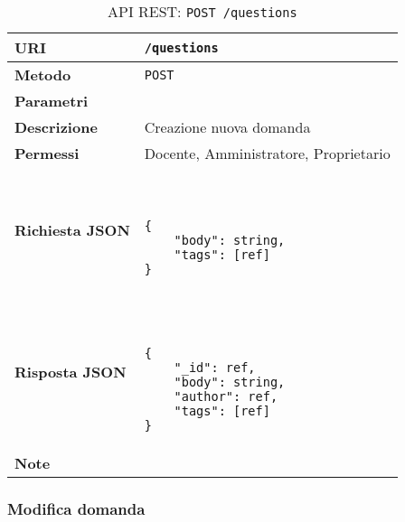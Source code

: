        \begin{table}[H]
            \begin{center}
                \begin{tabular}{p{} p{}}
                    \toprule
                    \textbf{URI} & \texttt{/questions} \\ \midrule
                    \textbf{Metodo} & \texttt{POST} \\ \midrule
                    \textbf{Parametri} & \\ \midrule
                    \textbf{Descrizione} & Creazione nuova domanda \\ \midrule
                    \textbf{Permessi} & Docente, Amministratore, Proprietario  \\ \midrule
                    \textbf{Richiesta JSON} & \
                        \begin{lstlisting}[basicstyle={\ttfamily}]
{
    "body": string,
    "tags": [ref]
}
                        \end{lstlisting}
                        \\ \midrule
                    \textbf{Risposta JSON} & \
                        \begin{lstlisting}[basicstyle={\ttfamily}]
{
	"_id": ref,
    "body": string,
    "author": ref,
    "tags": [ref]
}
                        \end{lstlisting}
                    	\\ \midrule
                    \textbf{Note} & \\
                    \bottomrule
                \end{tabular}
                \caption{API REST: \texttt{POST /questions}}
            \end{center}
        \end{table}

    \subsubsection{Modifica domanda}

